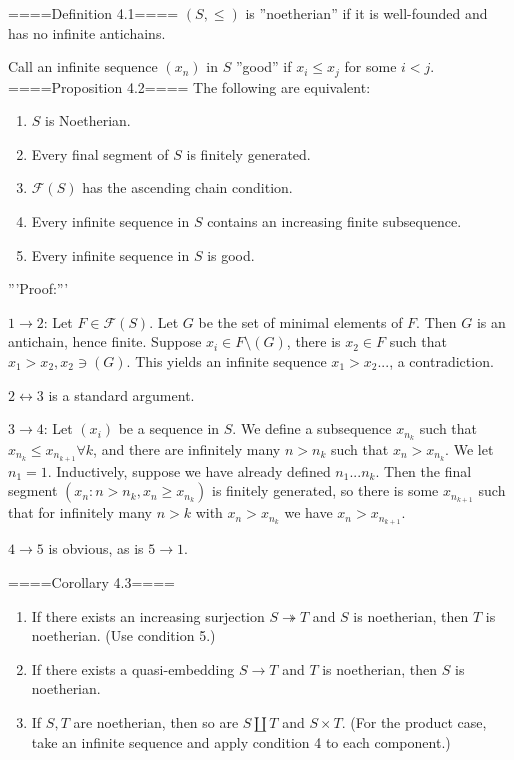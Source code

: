 ====Definition 4.1====
$(S, \leq)$ is ''noetherian'' if it is well-founded and has no infinite antichains.


Call an infinite sequence $(x_n)$ in $S$ ''good'' if $x_i \leq x_j$ for some $i<j$.
====Proposition 4.2====
The following are equivalent:
\begin{enumerate}
	\item  $S$ is Noetherian.
	\item  Every final segment of $S$ is finitely generated.
	\item  $\mathcal{F}(S)$ has the ascending chain condition.
	\item  Every infinite sequence in $S$ contains an increasing finite subsequence.
	\item  Every infinite sequence in $S$ is good.
\end{enumerate}

'''Proof:'''

$1 \rightarrow 2$: Let $F \in \mathcal{F}(S)$. Let $G$ be the set of minimal elements of $F$. Then $G$ is an antichain, hence finite. Suppose $x_i \in F \setminus (G)$, there is $x_2 \in F$ such that $x_1 > x_2, x_2 \ni (G)$. This yields an infinite sequence $x_1 > x_2...$, a contradiction.

$2 \leftrightarrow 3$ is a standard argument.

$3 \rightarrow 4$: Let $(x_i)$ be a sequence in $S$. We define a subsequence $x_{n_k}$ such that $x_{n_k} \leq x_{n_{k+1}} \forall k$, and there are infinitely many $n > n_k$ such that $x_n > x_{n_k}$. We let $n_1 = 1$. Inductively, suppose we have already defined $n_1...n_k$. Then the final segment $(x_n: n > n_k, x_n \geq x_{n_k})$ is finitely generated, so there is some $x_{n_{k+1}}$ such that for infinitely many $n>k$ with $x_n > x_{n_k}$ we have $x_n > x_{n_{k+1}}$.

$4 \rightarrow 5$ is obvious, as is $5 \rightarrow 1$.

====Corollary 4.3====
\begin{enumerate}
	\item If there exists an increasing surjection $S \twoheadrightarrow T$ and $S$ is noetherian, then $T$ is noetherian. (Use condition 5.)
	\item If there exists a quasi-embedding $S \rightarrow T$ and $T$ is noetherian, then $S$ is noetherian.
	\item If $S, T$ are noetherian, then so are $S \coprod T$ and $S \times T$. (For the product case, take an infinite sequence and apply condition 4 to each component.)
\end{enumerate}

